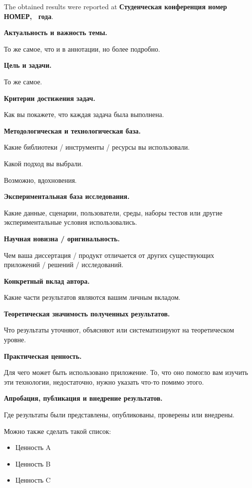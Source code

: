 \documentclass[a4paper,12pt]{report}
\newcommand{\yearOfWriting}{\the\year}
\newcommand{\conferencesList}{Студенческая конференция номер НОМЕР, \yearOfWriting~года}
\begin{document}
The obtained results were reported at \textbf{\conferencesList}\cite{self}.

\acronymsChapter

\introChapter

\textbf{Актуальность и важность темы.}

То же самое, что и в аннотации, но более подробно.

\textbf{Цель и задачи.}

То же самое.

\textbf{Критерии достижения задач.}

Как вы покажете, что каждая задача была выполнена.

\textbf{Методологическая и технологическая база.}

Какие библиотеки / инструменты / ресурсы вы использовали.

Какой подход вы выбрали.

Возможно, вдохновения.

\textbf{Экспериментальная база исследования.}

Какие данные, сценарии, пользователи, среды, наборы тестов или другие экспериментальные условия использовались.

\textbf{Научная новизна / оригинальность.}

Чем ваша диссертация / продукт отличается от других существующих приложений / решений / исследований.

\textbf{Конкретный вклад автора.}

Какие части результатов являются вашим личным вкладом.

\textbf{Теоретическая значимость полученных результатов.}

Что результаты уточняют, объясняют или систематизируют на теоретическом уровне.

\textbf{Практическая ценность.}

Для чего может быть использовано приложение.
То, что оно помогло вам изучить эти технологии, недостаточно,
нужно указать что-то помимо этого.

\textbf{Апробация, публикация и внедрение результатов.}

Где результаты были представлены, опубликованы, проверены или внедрены.

Можно также сделать такой список:
\begin{itemize}
    \item Ценность A
    \item Ценность B
    \item Ценность C
\end{itemize}
\end{document}
